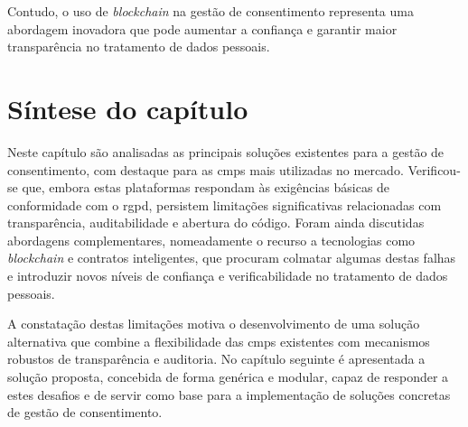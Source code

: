 Contudo, o uso de \textit{blockchain} na gestão de consentimento representa uma abordagem inovadora que pode aumentar a confiança e garantir maior transparência no tratamento de dados pessoais.

 

\section{Síntese do capítulo} 

Neste capítulo são analisadas as principais soluções existentes para a gestão de consentimento, com destaque para as \acrshort{cmp}s mais utilizadas no mercado. Verificou-se que, embora estas plataformas respondam às exigências básicas de conformidade com o \acrshort{rgpd}, persistem limitações significativas relacionadas com transparência, auditabilidade e abertura do código. Foram ainda discutidas abordagens complementares, nomeadamente o recurso a tecnologias como \textit{blockchain} e contratos inteligentes, que procuram colmatar algumas destas falhas e introduzir novos níveis de confiança e verificabilidade no tratamento de dados pessoais.

A constatação destas limitações motiva o desenvolvimento de uma solução alternativa que combine a flexibilidade das \acrshort{cmp}s existentes com mecanismos robustos de transparência e auditoria. No capítulo seguinte é apresentada a solução proposta, concebida de forma genérica e modular, capaz de responder a estes desafios e de servir como base para a implementação de soluções concretas de gestão de consentimento.
